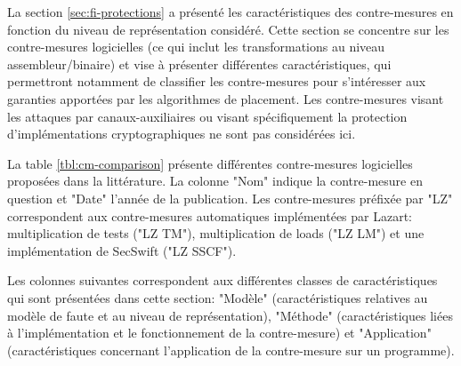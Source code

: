             La section \ref{sec:fi-protections} a présenté les caractéristiques des contre-mesures en fonction du niveau de représentation considéré.
            Cette section se concentre sur les contre-mesures logicielles (ce qui inclut les transformations au niveau assembleur/binaire) et vise à présenter différentes caractéristiques, qui permettront notamment de classifier les contre-mesures pour s'intéresser aux garanties apportées par les algorithmes de placement. 
            Les contre-mesures visant les attaques par canaux-auxiliaires ou visant spécifiquement la protection d'implémentations cryptographiques ne sont pas considérées ici.
            
            La table \ref{tbl:cm-comparison} présente différentes contre-mesures logicielles proposées dans la littérature. 
            La colonne "Nom" indique la contre-mesure en question et "Date" l'année de la publication. Les contre-mesures préfixée par "LZ" correspondent aux contre-mesures automatiques implémentées par Lazart: multiplication de tests ("LZ TM"), multiplication de loads ("LZ LM") et une implémentation de SecSwift \cite{Ferriere/LLVM19} ("LZ SSCF"). 
            
            Les colonnes suivantes correspondent aux différentes classes de caractéristiques qui sont présentées dans cette section: "Modèle" (caractéristiques relatives au modèle de faute et au niveau de représentation), "Méthode" (caractéristiques liées à l'implémentation et le fonctionnement de la contre-mesure) et "Application" (caractéristiques concernant l'application de la contre-mesure sur un programme).
            
